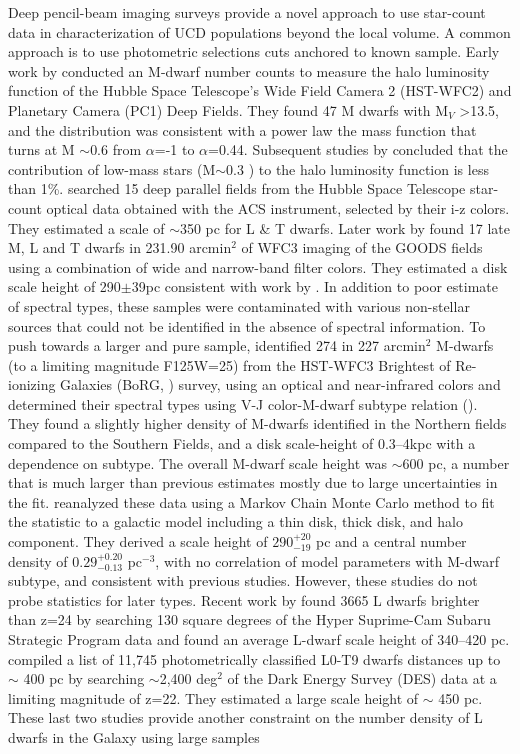 \documentclass[manuscript]{aastex63}
\begin{document}
Deep pencil-beam imaging surveys provide a novel approach to use star-count data in characterization of UCD populations beyond the local volume. A common approach is to use photometric selections cuts anchored to known sample. Early work by \cite{1997ApJ...482..913G} conducted an M-dwarf number counts to measure the halo luminosity function of the Hubble Space Telescope's Wide Field Camera 2 (HST-WFC2) and Planetary Camera (PC1) Deep Fields. They found 47 M dwarfs with M$_V$ \textgreater 13.5, and the distribution was consistent with a power law the mass function that turns at M $\sim$0.6 \Msun from $\alpha$=-1 to $\alpha$=0.44. Subsequent studies by \cite{1997A&A...328....5K, 1997A&A...328...83C} concluded that the contribution of low-mass stars (M$\sim$0.3 \Msun ) to the halo luminosity function is less than 1\%. \cite{2005ApJ...631L.159R} searched 15 deep parallel fields from the Hubble Space Telescope star-count optical data obtained with the ACS instrument, selected by their i-z colors. They estimated a scale of $\sim$350 pc for L \& T dwarfs. Later work by \cite{Ryan2011} found 17 late M, L and T dwarfs in 231.90 arcmin$^2$ of WFC3 imaging of the GOODS fields using a combination of wide and narrow-band filter colors. They estimated a disk scale height of 290$\pm$39pc consistent with work by \cite{2005ApJ...622..319P}. In addition to poor estimate of spectral types, these samples were contaminated with various non-stellar sources that could not be identified in the absence of spectral information. To push towards a larger and pure sample, \cite{Holwerda2014} identified  274 in 227 arcmin$^2$ M-dwarfs (to a limiting magnitude F125W=25) from the HST-WFC3 Brightest of Re-ionizing Galaxies (BoRG, \citealt{2009ApJ...695.1591P}) survey, using an optical and near-infrared colors and determined their spectral types using V-J color-M-dwarf subtype relation (\citealt{2009ApJ...695.1591P}). They found a slightly higher density of M-dwarfs identified in the Northern fields compared to the Southern Fields, and a  disk scale-height of 0.3--4kpc with a dependence on subtype. The overall M-dwarf scale height was $\sim$600 pc, a number that is much larger than previous estimates mostly due to large uncertainties in the fit. \cite{Vledder2016} reanalyzed these data using a Markov Chain Monte Carlo method to fit the statistic to a galactic model including a thin disk, thick disk, and halo component. They derived a scale height of $290^{+20}_{-19}$ pc and a central number density of $0.29^{+0.20}_{-0.13}$ pc$^{-3}$, with no correlation of model parameters with M-dwarf subtype, and consistent with previous studies. However, these studies do not probe statistics for later types. Recent work by \cite{Sorahana2018} found 3665 L dwarfs brighter than z=24 by searching 130 square degrees of the Hyper Suprime-Cam Subaru Strategic Program data and found an average L-dwarf scale height of 340--420 pc. \cite{2019arXiv190310806C} compiled a list of 11,745 photometrically classified L0-T9 dwarfs distances up to $\sim$ 400 pc by searching $\sim$2,400 deg$^2$ of the Dark Energy Survey (DES) data at a limiting magnitude of z=22. They estimated a large scale height of $\sim$ 450 pc. These last two studies provide another constraint on the number density of L dwarfs in the Galaxy using large samples 
\end{document}

